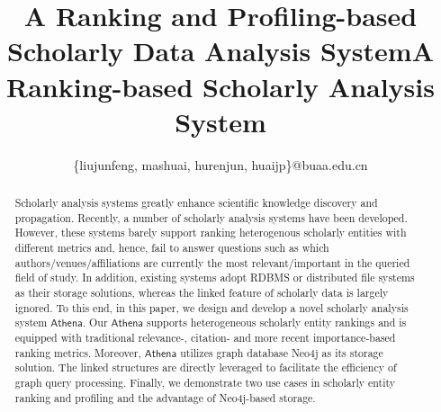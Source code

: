 \documentclass[10pt,conference,letterpaper]{IEEEtran}
\newcommand{\eat}[1]{}
\newcommand{\kw}[1]{{\ensuremath {\mathsf{#1}}}\xspace}
\newcommand{\oursystem}{\kw{Athena}}
\begin{document}
\title{A Ranking and Profiling-based Scholarly Data Analysis System}
\title{A Ranking-based Scholarly Analysis System}

\eat{
\author{\IEEEauthorblockN{Michael Shell}
\IEEEauthorblockA{School of Electrical and\\Computer Engineering\\
Georgia Institute of Technology\\
Atlanta, Georgia 30332--0250\\
Email: http://www.michaelshell.9org/contact.html}
\and
\IEEEauthorblockN{Homer Simpson}
\IEEEauthorblockA{Twentieth Century Fox\\
Springfield, USA\\
Email: homer@thesimpsons.com}
\and
\IEEEauthorblockN{James Kirk\\ and Montgomery Scott}
\IEEEauthorblockA{Starfleet Academy\\
San Francisco, California 96678--2391\\
Telephone: (800) 555--1212\\
Fax: (888) 555--1212}}
}%

\author{
\{liujunfeng, mashuai, hurenjun, huaijp\}@buaa.edu.cn}

\maketitle


\begin{abstract}
Scholarly analysis systems greatly enhance scientific knowledge discovery and propagation.
%
Recently, a number of scholarly analysis systems have been developed. However, these systems barely support ranking heterogenous scholarly entities with different metrics and, hence, fail to answer questions such as which authors/venues/affiliations are currently the most relevant/important in the queried field of study. In addition, existing systems adopt RDBMS or distributed file systems as their storage solutions, whereas the linked feature of scholarly data is largely ignored.
%
To this end, in this paper, we design and develop a novel scholarly analysis system \oursystem. Our \oursystem supports heterogeneous scholarly entity rankings and is equipped with traditional relevance-, citation- and more recent importance-based ranking metrics. Moreover, \oursystem utilizes graph database Neo4j as its storage solution. The linked structures are directly leveraged to facilitate the efficiency of graph query processing.
Finally, we demonstrate two use cases in scholarly entity ranking and profiling and the advantage of Neo4j-based storage. %
\end{abstract}
\end{document}
